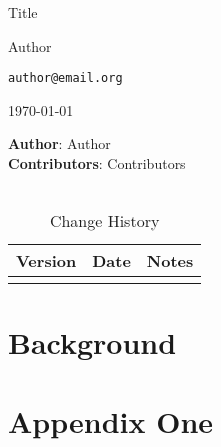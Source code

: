 \documentclass[oneside]{book}
\begin{document}
\fancyhf{} 
\renewcommand{\headrulewidth}{0pt}
\fancyfoot[C]{\thepage}

\frontmatter
\begin{titlepage}
	\vspace{1 in}
	\centering
	{\LARGE {Title}\par}
	\vspace{1 cm}
	Author\par 
	\texttt{author@email.org}\par
	\vspace{1 cm}
	\today
\end{titlepage}

\thispagestyle{empty}
\textbf{Author}: Author \\

\textbf{Contributors}: Contributors \\
\\

\begin{table}[ht]
	\begin{tabular}{l l l}
		\toprule
		Version & Date & Notes \\
		\hline
		&& \\
		\bottomrule
	\end{tabular}
	\caption{Change History}\label{tab:history}
\end{table}

\tableofcontents
\lstlistoflistings

\mainmatter
\begin{spacing}{1.618}
\chapter{Background}

\appendix
\chapter{Appendix One}

\end{spacing}
\backmatter

\printglossary[type=\acronymtype]
\clearpage

\printglossary
\clearpage

\printbibliography
\clearpage

\printindex
\end{document}
